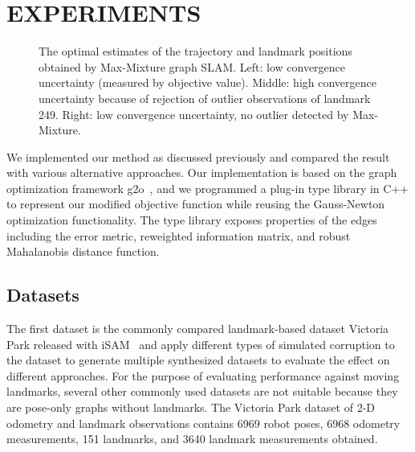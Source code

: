 \section{EXPERIMENTS}

\begin{figure}[!ht]
\caption{The optimal estimates of the trajectory and landmark positions
obtained by Max-Mixture graph SLAM.  Left: low convergence uncertainty
(measured by objective value). Middle: high convergence uncertainty because of
rejection of outlier observations of landmark 249.  Right: low convergence
uncertainty, no outlier detected by Max-Mixture.}
\label{fig:baseline}
\end{figure}

We implemented our method as discussed previously and compared the result with
various alternative approaches. Our implementation is based on the graph
optimization framework g2o~\cite{g2o}, and we programmed a plug-in type library
in C++ to represent our modified objective function while reusing the Gauss-Newton
optimization functionality. The type library exposes properties of the edges including
the error metric, reweighted information matrix, and robust Mahalanobis distance function.

\subsection{Datasets}

The first dataset is the commonly compared landmark-based dataset Victoria Park released with iSAM~\cite{isam} and apply different types of simulated corruption to the dataset to
generate multiple synthesized datasets to evaluate the effect on different
approaches.  For the purpose of evaluating performance against moving
landmarks, several other commonly used datasets are not suitable because they
are pose-only graphs without landmarks. The Victoria Park dataset of 2-D
odometry and landmark observations contains 6969 robot poses, 6968 odometry
measurements, 151 landmarks, and 3640 landmark measurements obtained.

